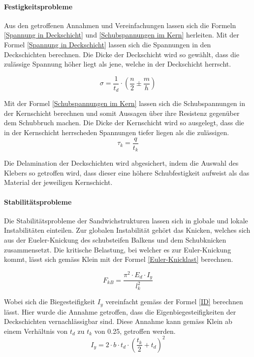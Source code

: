     \paragraph{Festigkeitsprobleme}
    Aus den getroffenen Annahmen und Vereinfachungen lassen sich die Formeln \ref{Spannung in Deckschicht} und \ref{Schubspannungen im Kern} herleiten. Mit der Formel \ref{Spannung in Deckschicht} lassen sich die Spannungen in den Deckschichten berechnen. Die Dicke der Deckschicht wird so gewählt, dass die zulässige Spannung höher liegt als jene, welche in der Deckschicht herrscht.

    \begin{equation}
      \label{Spannung in Deckschicht}
      \sigma = \frac{1}{t_d}\cdot \left ( \frac{n}{2} \pm \frac{m}{h}\right )
    \end{equation}

    Mit der Formel \ref{Schubspannungen im Kern} lassen sich die Schubspannungen in der Kernschicht berechnen und somit Aussagen über ihre Resistenz gegenüber dem Schubbruch machen. Die Dicke der Kernschicht wird so ausgelegt, dass die in der Kernschicht herrscheden Spannungen tiefer liegen als die zulässigen.
    \begin{equation}
      \label{Schubspannungen im Kern}
      \tau_k = \frac{q}{t_k}
    \end{equation}

    Die Delamination der Deckschichten wird abgesichert, indem die Auswahl des Klebers so getroffen wird, dass dieser eine höhere Schubfestigkeit aufweist als das Material der jeweiligen Kernschicht.

    \paragraph{Stabilitätsprobleme}
    Die Stabilitätsprobleme der Sandwichstrukturen lassen sich in globale und lokale Instabilitäten einteilen. Zur globalen Instabilität gehört das Knicken, welches sich aus der Eueler-Knickung des schubsteifen Balkens und dem Schubknicken zusammensetzt. Die kritische Belastung, bei welcher es zur Euler-Knickung kommt, lässt sich gemäss Klein \cite{klein} mit der Formel \ref{Euler-Knicklast} berechnen.

    \begin{equation}
      \label{Euler-Knicklast}
      F_{kB}=\frac{\pi^2 \cdot E_d \cdot I_y}{l_k^{2}}
    \end{equation}

    Wobei sich die Biegesteifigkeit $I_y$ vereinfacht gemäss der Formel \ref{ID} berechnen lässt. Hier wurde die Annahme getroffen, dass die Eigenbiegesteifigkeiten der Deckschichten vernachlässigbar sind. Diese Annahme kann gemäss Klein \cite{klein} ab einem Verhältnis von $t_d$ zu $t_k$ von 0.25, getroffen werden.
    \begin{equation}
      \label{ID}
      I_y = 2 \cdot b \cdot t_d \cdot \left( \frac{t_k}{2} + t_d \right )^{2}
    \end{equation}

